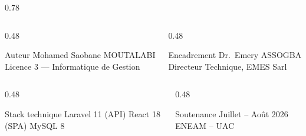 \documentclass[aspectratio=169, 10pt]{beamer}
\begin{document}
{\begin{frame}
\begin{columns}[T]
\begin{column}{0.78\textwidth}
      \begin{columns}[T]
        \begin{column}{0.48\textwidth}
          \begin{block}{\scriptsize Auteur}
            \scriptsize Mohamed Saobane MOUTALABI\\
            Licence 3 --- Informatique de Gestion
          \end{block}
        \end{column}
        \begin{column}{0.48\textwidth}
          \begin{block}{\scriptsize Encadrement}
            \scriptsize Dr.~Emery ASSOGBA\\
            Directeur Technique, EMES Sarl
          \end{block}
        \end{column}
      \end{columns}
      \vspace{0.3cm}
      \begin{columns}[T]
        \begin{column}{0.48\textwidth}
          \begin{block}{\scriptsize Stack technique}
            \scriptsize Laravel 11 (API) \textbar{} React 18 (SPA) \textbar{} MySQL 8
          \end{block}
        \end{column}
        \begin{column}{0.48\textwidth}
          \begin{block}{\scriptsize Soutenance}
            \scriptsize Juillet -- Août 2026 \textbar{} ENEAM -- UAC
          \end{block}
        \end{column}
      \end{columns}
    \end{column}
  \end{columns}
  \vspace{0.1cm}
\end{frame}
}
\end{document}
